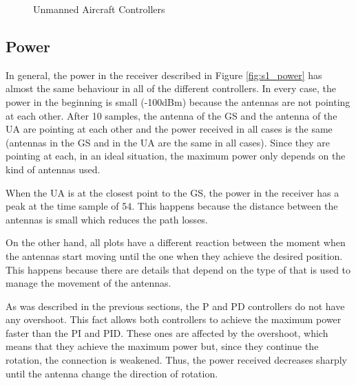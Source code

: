 \begin{figure}[H]
	\hfill
	\hfill
	\caption{Unmanned Aircraft Controllers}
	\label{fig:s1_ua}
\end{figure}

\subsection{Power}
In general, the power in the receiver described in Figure \ref{fig:s1_power} has almost the same behaviour in all of the different controllers. In every case, the power in the beginning is small (-100dBm) because the antennas are not pointing at each other. After 10 samples, the antenna of the GS and the antenna of the UA are pointing at each other and the power received in all cases is the same (antennas in the GS and in the UA are the same in all cases). Since they are pointing at each, in an ideal situation, the maximum power only depends on the kind of antennas used.

When the UA is at the closest point to the GS, the power in the receiver has a peak at the time sample of 54. This happens because the distance between the antennas is small which reduces the path losses.

On the other hand, all plots have a different reaction between the moment when the antennas start moving until the one when they achieve the desired position. This happens because there are details that depend on the type of that is used to manage the movement of the antennas. 

As was described in the previous sections, the P and PD controllers do not have any overshoot. This fact allows both controllers to achieve the maximum power faster than the PI and PID. These ones are affected by the overshoot, which means that they achieve the maximum power but, since they continue the rotation, the connection is weakened. Thus, the power received decreases sharply until the antenna change the direction of rotation.


